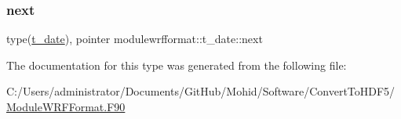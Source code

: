\mbox{\label{structmodulewrfformat_1_1t__date_ac60560d4a5bc28966cdf4f490895c69d}} 
\subsubsection{\texorpdfstring{next}{next}}
{\footnotesize\ttfamily type(\mbox{\hyperlink{structmodulewrfformat_1_1t__date}{t\+\_\+date}}), pointer modulewrfformat\+::t\+\_\+date\+::next\hspace{0.3cm}{\ttfamily [private]}}



The documentation for this type was generated from the following file\+:\begin{DoxyCompactItemize}
\item 
C\+:/\+Users/administrator/\+Documents/\+Git\+Hub/\+Mohid/\+Software/\+Convert\+To\+H\+D\+F5/\mbox{\hyperlink{_module_w_r_f_format_8_f90}{Module\+W\+R\+F\+Format.\+F90}}\end{DoxyCompactItemize}
